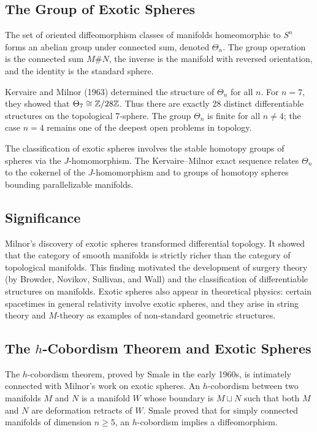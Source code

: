 \subsection{The Group of Exotic Spheres}

The set of oriented diffeomorphism classes of manifolds homeomorphic to \(S^n\) forms an abelian group under connected sum, denoted \(\Theta_n\). The group operation is the connected sum \(M \# N\), the inverse is the manifold with reversed orientation, and the identity is the standard sphere.

Kervaire and Milnor (1963) determined the structure of \(\Theta_n\) for all \(n\). For \(n = 7\), they showed that \(\Theta_7 \cong \mathbb{Z}/28\mathbb{Z}\). Thus there are exactly 28 distinct differentiable structures on the topological 7-sphere. The group \(\Theta_n\) is finite for all \(n \neq 4\); the case \(n = 4\) remains one of the deepest open problems in topology.

The classification of exotic spheres involves the stable homotopy groups of spheres via the \(J\)-homomorphism. The Kervaire--Milnor exact sequence relates \(\Theta_n\) to the cokernel of the \(J\)-homomorphism and to groups of homotopy spheres bounding parallelizable manifolds.

\subsection{Significance}

Milnor's discovery of exotic spheres transformed differential topology. It showed that the category of smooth manifolds is strictly richer than the category of topological manifolds. This finding motivated the development of surgery theory (by Browder, Novikov, Sullivan, and Wall) and the classification of differentiable structures on manifolds. Exotic spheres also appear in theoretical physics: certain spacetimes in general relativity involve exotic spheres, and they arise in string theory and \(M\)-theory as examples of non-standard geometric structures.

\subsection{The \texorpdfstring{\(h\)}{h}-Cobordism Theorem and Exotic Spheres}

The \(h\)-cobordism theorem, proved by Smale in the early 1960s, is intimately connected with Milnor's work on exotic spheres. An \(h\)-cobordism between two manifolds \(M\) and \(N\) is a manifold \(W\) whose boundary is \(M \sqcup N\) such that both \(M\) and \(N\) are deformation retracts of \(W\). Smale proved that for simply connected manifolds of dimension \(n \geq 5\), an \(h\)-cobordism implies a diffeomorphism.

